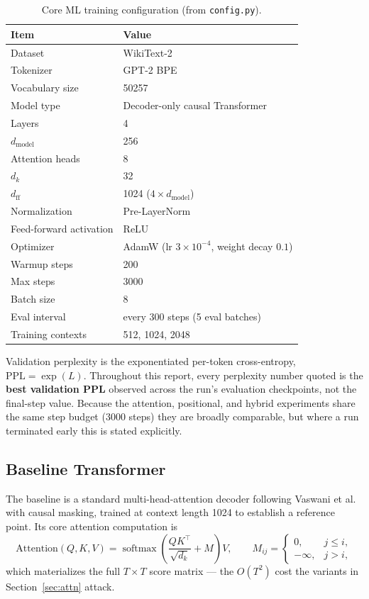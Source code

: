 \documentclass[11pt]{article}
\begin{document}
\begin{table}[H]
\centering
\caption{Core ML training configuration (from \texttt{config.py}).}
\label{tab:setup}
\begin{tabular}{ll}
\toprule
Item & Value \\
\midrule
Dataset & WikiText-2 \\
Tokenizer & GPT-2 BPE \\
Vocabulary size & \num{50257} \\
Model type & Decoder-only causal Transformer \\
Layers & 4 \\
$d_{\text{model}}$ & 256 \\
Attention heads & 8 \\
$d_k$ & 32 \\
$d_{\text{ff}}$ & 1024 ($4\times d_{\text{model}}$) \\
Normalization & Pre-LayerNorm \\
Feed-forward activation & ReLU \\
Optimizer & AdamW (lr $3\times10^{-4}$, weight decay $0.1$) \\
Warmup steps & 200 \\
Max steps & 3000 \\
Batch size & 8 \\
Eval interval & every 300 steps (5 eval batches) \\
Training contexts & 512, 1024, 2048 \\
\bottomrule
\end{tabular}
\end{table}

Validation perplexity is the exponentiated per-token cross-entropy,
$\text{PPL}=\exp(L)$. Throughout this report, every perplexity number quoted is
the \textbf{best validation PPL} observed across the run's evaluation
checkpoints, not the final-step value. Because the attention, positional, and
hybrid experiments share the same step budget (3000 steps) they are broadly
comparable, but where a run terminated early this is stated explicitly.

\subsection{Baseline Transformer}
\label{sec:baseline}
The baseline is a standard multi-head-attention decoder following
Vaswani et al.~\cite{vaswani2017} with causal masking, trained at context
length 1024 to establish a reference point. Its core attention computation is
\[
\text{Attention}(Q,K,V)=\operatorname{softmax}\!\left(\frac{QK^\top}{\sqrt{d_k}}+M\right)V,
\qquad
M_{ij}=\begin{cases}0,& j\le i,\\ -\infty,& j>i,\end{cases}
\]
which materializes the full $T\times T$ score matrix --- the $O(T^2)$ cost the
variants in Section~\ref{sec:attn} attack.
\end{document}

